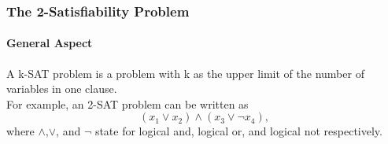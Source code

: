 \documentclass{beamer}
\begin{document}
\begin{frame}
	\frametitle{The 2-Satisfiability Problem}
	\framesubtitle{General Aspect}

	A k-SAT problem is a problem with k as the upper limit of the
	number of variables in one clause. \\
	For example, an 2-SAT problem can be written as 
	\begin{equation*}
	(x_1\lor x_2)\land (x_3\lor \neg x_4),
	\end{equation*}
	where $\land$,$\lor$, and $\neg$ state for logical and, logical or, and logical not respectively. 
	
\end{frame}

\end{document}
